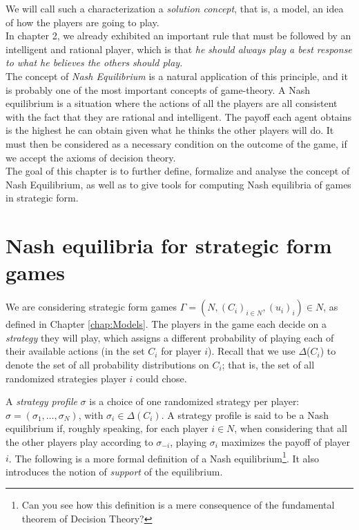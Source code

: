   We will call such a characterization a \emph{solution concept},
  that is,
 a model, an idea of how the players are going to play.\\
In chapter 2, we already exhibited an important rule that must be followed by an intelligent and rational player, which is that \emph{he should always play a best response to what he believes the others should play.}\\
The concept of \emph{Nash Equilibrium} is a natural application of this principle,
and it is probably one of the most important concepts of game-theory.
 A Nash equilibrium is a situation where the actions of all the players are all consistent with the fact that they are rational and intelligent.
  The payoff each agent obtains is the highest he can obtain given what he thinks the other players will do.
  It must then be considered as a necessary condition on the outcome of the game, if we accept the axioms of decision theory. \\
The goal of this chapter is to further define, formalize and analyse the concept of Nash Equilibrium, as well as to give tools for computing Nash equilibria of games in strategic form.



\section{Nash equilibria for strategic form games}

We are considering
strategic form games $\Gamma = (N,(C_i)_{i \in N}, (u_i)_i) \in N $,
as defined in Chapter \ref{chap:Models}.
The players in the game each decide on a \emph{strategy}
 they will play, which assigns a different probability
 of playing each of their available actions
 (in the set $C_i$ for player $i$).
 Recall that we use $\Delta$($C_i$) to denote the set of all
 probability distributions on $C_i$; that is,  the set
 of all randomized strategies player $i$ could chose.

A \emph{strategy profile} $\sigma$ is a choice of one randomized strategy per player: $\sigma = (\sigma_1, \ldots, \sigma_N)$, with $\sigma_i \in \Delta(C_i)$. A strategy profile is said to be a Nash equilibrium if, roughly speaking, for each player $i \in N$,  when considering that all the other players play according to $\sigma_{-i}$, playing $\sigma_i$ maximizes the payoff of player $i$.
The following is a more formal definition of a Nash equilibrium\footnote{Can you see how this definition is a mere consequence of the fundamental theorem of Decision Theory?}.
It also introduces the notion of \emph{support} of the equilibrium.

